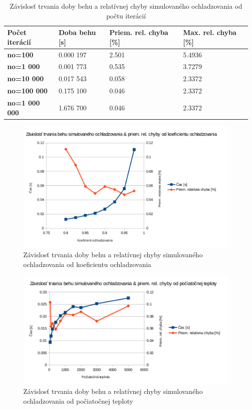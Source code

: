 \documentclass[slovak]{article}
\begin{document}
\begin{table}[htb!]\centering
	\begin{tabularx}{\textwidth}{ | X | X | X | X |}
	  \hline                       
		\textbf{Počet iterácií}	& \textbf{Doba behu [s]} 	& \textbf{Priem. rel. chyba [\%]} 	& \textbf{Max. rel. chyba [\%]} 	\\ \hline
		\textbf{no=100}			&	0.000 197 	&	2.501	&	5.4936	\\ \hline
		\textbf{no=1 000}		&	0.001 773	&	0.535 	&	3.7279	\\ \hline
		\textbf{no=10 000}		&	0.017 543	&	0.058	&	2.3372	\\ \hline
		\textbf{no=100 000}		&	0.175 100	&	0.046	&	2.3372	\\ \hline
		\textbf{no=1 000 000}	&	1.676 700	&	0.046	&	2.3372	\\ \hline
	\end{tabularx}
\caption{Závislosť trvania doby behu a relatívnej chyby simulovaného ochladzovania od počtu iterácií}
\label{tab4}
\end{table}

\begin{figure}[htb!]\centering
	\includegraphics[scale=0.8]{./4_1.pdf}
	\caption{Závislosť trvania doby behu a relatívnej chyby simulovaného ochladzovania od koeficientu ochladzovania}
	\label{gr:graf1}
\end{figure}

\begin{figure}[htb!]\centering
	\includegraphics[scale=0.8]{./4_2.pdf}
	\caption{Závislosť trvania doby behu a relatívnej chyby simulovaného ochladzovania od počiatočnej teploty}
	\label{gr:graf2}
\end{figure}
\end{document}
